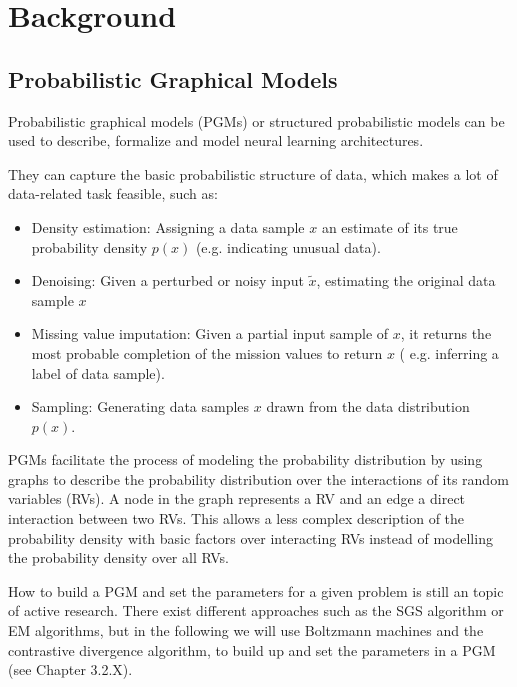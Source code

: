 \chapter{Background}

\section{Probabilistic Graphical Models}

Probabilistic graphical models (PGMs) or structured probabilistic models can be used to describe, formalize and model neural learning architectures.

They can capture the basic probabilistic structure of data, which makes a lot of data-related task feasible, such as:
\begin{itemize}

\item Density estimation: Assigning a data sample $x$ an estimate of its true probability density $p(x)$ (e.g. indicating unusual data).

\item Denoising: Given a perturbed or noisy input $\widetilde{x}$,  estimating the original data sample $x$

\item Missing value imputation: Given a partial input sample of $x$, it returns the most probable completion of the mission values to return $x$ ( e.g. inferring a label of data sample).

\item Sampling: Generating data samples $x$ drawn from the data distribution $p(x)$. 

\end{itemize}  

PGMs facilitate the process of modeling the probability distribution by using graphs to describe the probability distribution over the interactions of its random variables (RVs).
A node in the graph represents a RV and an edge a direct interaction between two RVs.
This allows a less complex description of the probability density with basic factors over interacting RVs instead of modelling the probability density over all RVs. 

How to build a PGM and set the parameters for a given problem is still an topic of active research.
There exist different approaches such as the SGS algorithm or EM algorithms, but in the following we will use Boltzmann machines and the contrastive divergence algorithm, to build up and set the parameters in a PGM (see Chapter 3.2.X).


